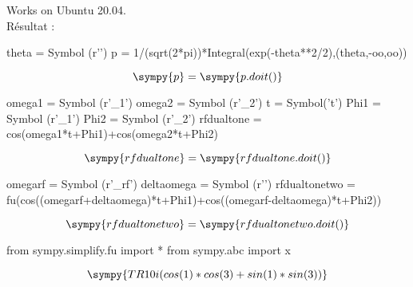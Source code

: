 \documentclass[12pt,french]{article}
\begin{document}
Works on Ubuntu 20.04. \\

Résultat : 

\begin{sympycode}
theta = Symbol (r'\theta')
p = 1/(sqrt(2*pi))*Integral(exp(-theta**2/2),(theta,-oo,oo))
\end{sympycode}
\begin{equation}
    \sympy{p}=\sympy{p.doit()}
\end{equation}

\begin{sympycode}
omega1 = Symbol (r'\omega_1')
omega2 = Symbol (r'\omega_2')
t = Symbol('t')
Phi1 = Symbol (r'\Phi_1')
Phi2 = Symbol (r'\Phi_2')
rfdualtone = cos(omega1*t+Phi1)+cos(omega2*t+Phi2)
\end{sympycode}
\begin{equation}
    \sympy{rfdualtone}=\sympy{rfdualtone.doit()}
\end{equation}

\begin{sympycode}
omegarf = Symbol (r'\omega_{rf}')
deltaomega = Symbol (r'\Delta\omega')
rfdualtonetwo = fu(cos((omegarf+deltaomega)*t+Phi1)+cos((omegarf-deltaomega)*t+Phi2))
\end{sympycode}
\begin{equation}
    \sympy{rfdualtonetwo}=\sympy{rfdualtonetwo.doit()}
\end{equation}
    
\begin{sympycode}
from sympy.simplify.fu import *
from sympy.abc import x
\end{sympycode}
\begin{equation}
    \sympy{TR10i(cos(1)*cos(3) + sin(1)*sin(3))}
\end{equation}
\end{document}
